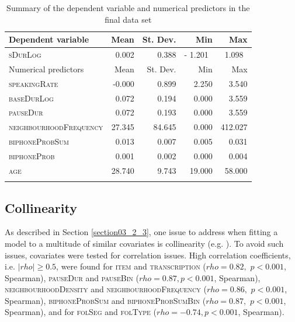 \begin{table}\fontsize{10}{11}
\caption{Summary of the dependent variable and numerical predictors in the final data set}
\label{tab:4.3}
\centering
\begin{tabular}{lrrrr} 
\lsptoprule
Dependent variable     & Mean   & St. Dev. & Min        & Max      \\ 
\midrule
\textsc{sDurLog}                & 0.002  & 0.388    & -
  1.201~ & 1.098~   \\ 
\midrule
Numerical predictors   & Mean   & St. Dev. & Min        & Max      \\ 
\midrule
\textsc{speakingRate}           & -0.000 & 0.899    & 2.250      & 3.540    \\
\textsc{baseDurLog}             & 0.072  & 0.194    & 0.000      & 3.559    \\
\textsc{pauseDur}               & 0.072  & 0.193    & 0.000      & 3.559    \\
\textsc{neighbourhoodFrequency} & 27.345 & 84.645   & 0.000      & 412.027  \\
\textsc{biphoneProbSum}         & 0.013  & 0.007    & 0.005      & 0.031    \\
\textsc{biphoneProb}            & 0.001  & 0.002    & 0.000      & 0.004    \\
\textsc{age}                    & 28.740 & 9.743    & 19.000     & 58.000   \\
\lspbottomrule
\end{tabular}
\end{table}


\subsection{Collinearity}\label{section04_2_3}

As described in Section \ref{section03_2_3}, one issue to address when fitting a model to a multitude of similar covariates is collinearity (e.g. \cite{Tomaschek2018collin}). To avoid such issues, covariates were tested for correlation issues. High correlation coefficients, i.e. $|rho|≥0.5$, were found for \textsc{item} and \textsc{transcription} ($rho=0.82,$ $p<0.001$, Spearman), \textsc{pauseDur} and \textsc{pauseBin} ($rho=0.87,p<0.001$, Spearman), \textsc{neighbourhoodDensity} and \textsc{neighbourhoodFrequency} ($rho=0.86,$ $p<0.001$, Spearman), \textsc{biphoneProbSum} and \textsc{biphoneProbSumBin} ($rho=0.87,$ $p<0.001$, Spearman), and for \textsc{folSeg} and \textsc{folType} ($rho=-0.74,p<0.001$, Spearman).    


